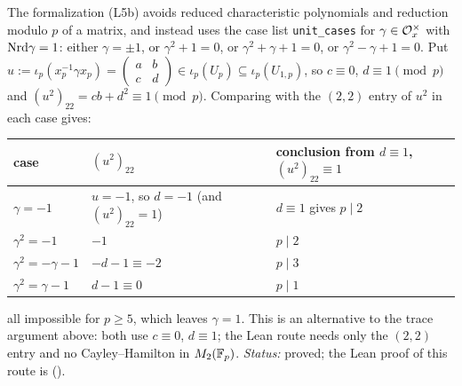 \begin{remark}\label{rem:s01-stab-lean}
The formalization (L5b) avoids reduced characteristic polynomials and reduction modulo $p$ of a matrix, and instead uses
the case list \texttt{unit\_cases} for $\gamma\in\mathcal{O}_x^\times$ with $\mathrm{Nrd}\gamma=1$: either $\gamma=\pm1$, or $\gamma^2+1=0$, or $\gamma^2+\gamma+1=0$, or
$\gamma^2-\gamma+1=0$. Put $u:=\iota_p(x_p^{-1}\gamma x_p)=\left(\begin{smallmatrix}a&b\\c&d\end{smallmatrix}\right)\in\iota_p(U_p)\subseteq\iota_p(U_{1,p})$, so $c\equiv0$, $d\equiv1\pmod p$ and
$(u^2)_{22}=cb+d^2\equiv1\pmod p$. Comparing with the $(2,2)$ entry of $u^2$ in each case gives:
\begin{center}\begin{tabular}{lll}
case & $(u^2)_{22}$ & conclusion from $d\equiv1$, $(u^2)_{22}\equiv1$\\\hline
$\gamma=-1$ & $u=-1$, so $d=-1$ (and $(u^2)_{22}=1$) & $d\equiv1$ gives $p\mid2$\\
$\gamma^2=-1$ & $-1$ & $p\mid2$\\
$\gamma^2=-\gamma-1$ & $-d-1\equiv-2$ & $p\mid3$\\
$\gamma^2=\gamma-1$ & $d-1\equiv0$ & $p\mid1$
\end{tabular}\end{center}
all impossible for $p\ge5$, which leaves $\gamma=1$.
This is an alternative to the trace argument above: both use $c\equiv0$, $d\equiv1$; the Lean route needs only the $(2,2)$ entry and no Cayley--Hamilton in $M_2(\mathbb{F}_p)$.
\emph{Status:} proved; the Lean proof of this route is \stformal{} ().
\end{remark}
